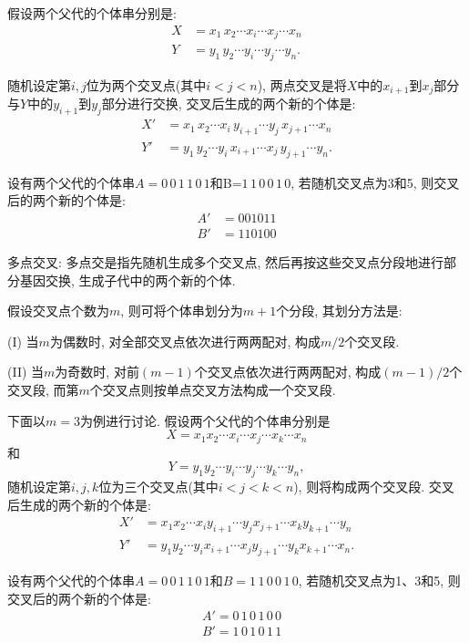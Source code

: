 假设两个父代的个体串分别是:
\begin{align}
    X&=x_1\, x_2 \cdots x_i \cdots x_j \cdots x_n\\
    Y&=y_1\, y_2 \cdots y_i \cdots y_j \cdots y_n.
\end{align}

随机设定第$i,j$位为两个交叉点(其中$i<j<n$), 两点交叉是将$X$中的$x_{i+1}$到$x_j$部分与$Y$中的$y_{i+1}$到$y_j$部分进行交换, 交叉后生成的两个新的个体是:
\begin{align}
    X'&= x_1\, x_2 \cdots x_i\, y_{i+1} \cdots y_j\, x_{j+1} \cdots x_n\\
    Y'&= y_1\, y_2  \cdots y_i\, x_{i+1} \cdots x_j\, y_{j+1} \cdots y_n.
\end{align}

\begin{example}
设有两个父代的个体串$A= 0\, 0\,  1\,  1\,  0\,  1$和B=$1\,  1\,  0\,  0\,  1\,  0$, 若随机交叉点为3和5, 则交叉后的两个新的个体是:
\begin{align}
     A'&= 0 0 1 0 1 1\\
    B'&= 1 1 0 1 0 0
\end{align}
\end{example}

     多点交叉: 多点交是指先随机生成多个交叉点, 然后再按这些交叉点分段地进行部分基因交换, 生成子代中的两个新的个体.

假设交叉点个数为$m$, 则可将个体串划分为$m+1$个分段, 其划分方法是:

\qquad (I) 当$m$为偶数时, 对全部交叉点依次进行两两配对, 构成$m/2$个交叉段.

\qquad (II) 当$m$为奇数时, 对前$(m-1)$个交叉点依次进行两两配对, 构成$(m-1)/2$个交叉段, 而第$m$个交叉点则按单点交叉方法构成一个交叉段.

下面以$m=3$为例进行讨论.
假设两个父代的个体串分别是$$X=x_1 x_2 \cdots x_i \cdots x_j \cdots x_k \cdots x_n$$和$$Y=y_1 y_2 \cdots y_i \cdots y_j \cdots y_k \cdots y_n,$$
随机设定第$i,j,k$位为三个交叉点(其中$i<j<k<n$), 则将构成两个交叉段. 交叉后生成的两个新的个体是:
\begin{align}
  X'&= x_1 x_2 \cdots x_i  y_{i+1} \cdots y_j x_{j+1} \cdots x_k y_{k+1} \cdots y_n\\
  Y'&= y_1 y_2 \cdots y_i x_{i+1} \cdots x_j y_{j+1} \cdots y_k x_{k+1} \cdots x_n.
\end{align}
\begin{example}
设有两个父代的个体串$A= 0\, 0\, 1\, 1\, 0\, 1$和$B= 1\, 1\, 0\, 0\, 1\, 0$, 若随机交叉点为1、3和5, 则交叉后的两个新的个体是:
\begin{align}
    &A'= 0\, 1\, 0\, 1\, 0\, 0\\
    &B'= 1\, 0\, 1\, 0\, 1\, 1
\end{align}
\end{example}

